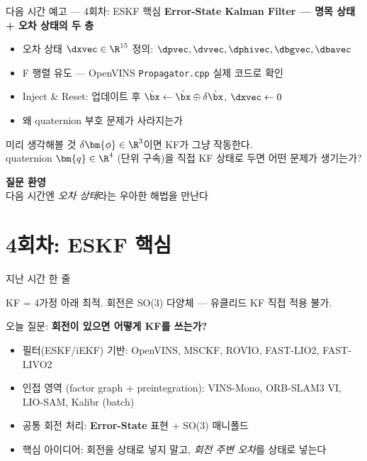 \begin{frame}{다음 시간 예고 — 4회차: ESKF 핵심}
  \textbf{Error-State Kalman Filter — 명목 상태 + 오차 상태의 두 층}
  \begin{itemize}
    \item 오차 상태 $\dxvec \in \R^{15}$ 정의: $\dpvec, \dvvec, \dphivec, \dbgvec, \dbavec$
    \item F 행렬 유도 — OpenVINS \texttt{Propagator.cpp} 실제 코드로 확인
    \item Inject \& Reset: 업데이트 후 $\hat\bx \leftarrow \hat\bx \oplus \delta\hat\bx$, $\dxvec \leftarrow 0$
    \item 왜 quaternion 부호 문제가 사라지는가
  \end{itemize}
  \vspace{0.4em}
  \begin{block}{미리 생각해볼 것}
    $\delta\bm{\phi} \in \R^3$이면 KF가 그냥 작동한다. \\
    quaternion $\bm{q} \in \R^4$ (단위 구속)을 직접 KF 상태로 두면 어떤 문제가 생기는가?
  \end{block}
\end{frame}

\begin{frame}
  \vspace{1.5cm}
  \begin{center}
    {\Huge \textbf{질문 환영}}\\[1em]
    \large 다음 시간엔 \emph{오차 상태}라는 우아한 해법을 만난다
  \end{center}
\end{frame}

\section{4회차: ESKF 핵심}


\begin{frame}{지난 시간 한 줄}
  \begin{center}
    \large
    KF = 4가정 아래 최적. 회전은 SO(3) 다양체 — 유클리드 KF 직접 적용 불가.
  \end{center}
  \vspace{0.5em}
  오늘 질문: \textbf{회전이 있으면 어떻게 KF를 쓰는가?}
  \vspace{0.4em}
  \begin{itemize}
    \item 필터(ESKF/iEKF) 기반: OpenVINS, MSCKF, ROVIO, FAST-LIO2, FAST-LIVO2
    \item 인접 영역 (factor graph + preintegration): VINS-Mono, ORB-SLAM3 VI, LIO-SAM, Kalibr (batch)
    \item 공통 회전 처리: \textbf{Error-State} 표현 + SO(3) 매니폴드
    \item 핵심 아이디어: 회전을 상태로 넣지 말고, \emph{회전 주변 오차}를 상태로 넣는다
  \end{itemize}
\end{frame}

